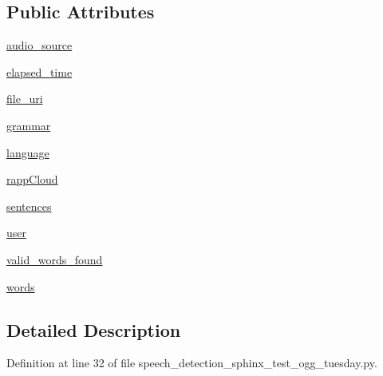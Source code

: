 \subsection*{Public Attributes}
\begin{DoxyCompactItemize}
\item 
\hyperlink{classspeech__detection__sphinx__test__ogg__tuesday_1_1RappInterfaceTest_a5eaffe615b21ad16fc9f151fe30b4e6b}{audio\-\_\-source}
\item 
\hyperlink{classspeech__detection__sphinx__test__ogg__tuesday_1_1RappInterfaceTest_a7489f4e4554c48afd803a3cee91c96af}{elapsed\-\_\-time}
\item 
\hyperlink{classspeech__detection__sphinx__test__ogg__tuesday_1_1RappInterfaceTest_aad9f84b21e9d2be851acd96decea81dd}{file\-\_\-uri}
\item 
\hyperlink{classspeech__detection__sphinx__test__ogg__tuesday_1_1RappInterfaceTest_a47c2a476f2303fce0b71df4894098bf5}{grammar}
\item 
\hyperlink{classspeech__detection__sphinx__test__ogg__tuesday_1_1RappInterfaceTest_aa3bb47314aa73d5f5c28bd911fd66d78}{language}
\item 
\hyperlink{classspeech__detection__sphinx__test__ogg__tuesday_1_1RappInterfaceTest_a31b97673940ca5b7ca321473994b2cfe}{rapp\-Cloud}
\item 
\hyperlink{classspeech__detection__sphinx__test__ogg__tuesday_1_1RappInterfaceTest_ae7caa49927e4c5766b5fbf1c638eafbc}{sentences}
\item 
\hyperlink{classspeech__detection__sphinx__test__ogg__tuesday_1_1RappInterfaceTest_aabf71ed2a48f5f43b345f9df87c020a2}{user}
\item 
\hyperlink{classspeech__detection__sphinx__test__ogg__tuesday_1_1RappInterfaceTest_a15fe3dc88f2c454ab1da9cf27c3dbe11}{valid\-\_\-words\-\_\-found}
\item 
\hyperlink{classspeech__detection__sphinx__test__ogg__tuesday_1_1RappInterfaceTest_a8e01bca98cc833c09cde253268a315f0}{words}
\end{DoxyCompactItemize}


\subsection{Detailed Description}


Definition at line 32 of file speech\-\_\-detection\-\_\-sphinx\-\_\-test\-\_\-ogg\-\_\-tuesday.\-py.



